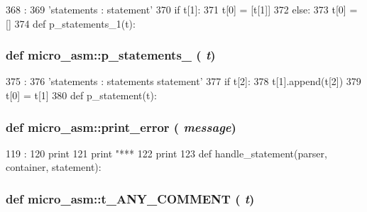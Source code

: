 \begin{DoxyCode}
368                      :
369     'statements : statement'
370     if t[1]:
371         t[0] = [t[1]]
372     else:
373         t[0] = []
374 
def p_statements_1(t):
\end{DoxyCode}
\hypertarget{namespacemicro__asm_a33c1a47687c46c90cb9435de8cb17c32}{
\subsubsection[{p\_\-statements\_\-1}]{\setlength{\rightskip}{0pt plus 5cm}def micro\_\-asm::p\_\-statements\_ ( {\em t})}}
\label{namespacemicro__asm_a33c1a47687c46c90cb9435de8cb17c32}



\begin{DoxyCode}
375                      :
376     'statements : statements statement'
377     if t[2]:
378         t[1].append(t[2])
379     t[0] = t[1]
380 
def p_statement(t):
\end{DoxyCode}
\hypertarget{namespacemicro__asm_a96434e74020a56392cf780137ed37e97}{
\subsubsection[{print\_\-error}]{\setlength{\rightskip}{0pt plus 5cm}def micro\_\-asm::print\_\-error ( {\em message})}}
\label{namespacemicro__asm_a96434e74020a56392cf780137ed37e97}



\begin{DoxyCode}
119                         :
120     print
121     print "*** %
122     print
123 
def handle_statement(parser, container, statement):
\end{DoxyCode}
\hypertarget{namespacemicro__asm_aebcbdea8d15279a91facd2b15955adee}{
\subsubsection[{t\_\-ANY\_\-COMMENT}]{\setlength{\rightskip}{0pt plus 5cm}def micro\_\-asm::t\_\-ANY\_\-COMMENT ( {\em t})}}
\label{namespacemicro__asm_aebcbdea8d15279a91facd2b15955adee}



